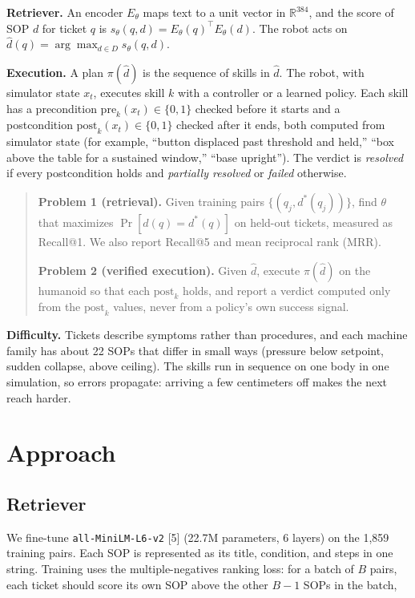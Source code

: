 \documentclass[
  10pt,
  twocolumn]{article}
\begin{document}
\textbf{Retriever.} An encoder \(E_\theta\) maps text to a unit vector
in \(\mathbb{R}^{384}\), and the score of SOP \(d\) for ticket \(q\) is
\(s_\theta(q, d) = E_\theta(q)^\top E_\theta(d)\). The robot acts on
\(\hat d(q) = \arg\max_{d \in D} s_\theta(q, d)\).

\textbf{Execution.} A plan \(\pi(\hat d)\) is the sequence of skills in
\(\hat d\). The robot, with simulator state \(x_t\), executes skill
\(k\) with a controller or a learned policy. Each skill has a
precondition \(\mathrm{pre}_k(x_t) \in \{0, 1\}\) checked before it
starts and a postcondition \(\mathrm{post}_k(x_t) \in \{0, 1\}\) checked
after it ends, both computed from simulator state (for example, ``button
displaced past threshold and held,'' ``box above the table for a
sustained window,'' ``base upright''). The verdict is \emph{resolved} if
every postcondition holds and \emph{partially resolved} or \emph{failed}
otherwise.

\begin{quote}
\textbf{Problem 1 (retrieval).} Given training pairs
\(\{(q_j, d^*(q_j))\}\), find \(\theta\) that maximizes
\(\Pr[\hat d(q) = d^*(q)]\) on held-out tickets, measured as Recall@1.
We also report Recall@5 and mean reciprocal rank (MRR).

\textbf{Problem 2 (verified execution).} Given \(\hat d\), execute
\(\pi(\hat d)\) on the humanoid so that each \(\mathrm{post}_k\) holds,
and report a verdict computed only from the \(\mathrm{post}_k\) values,
never from a policy's own success signal.
\end{quote}

\textbf{Difficulty.} Tickets describe symptoms rather than procedures,
and each machine family has about 22 SOPs that differ in small ways
(pressure below setpoint, sudden collapse, above ceiling). The skills
run in sequence on one body in one simulation, so errors propagate:
arriving a few centimeters off makes the next reach harder.

\section{Approach}\label{approach}

\subsection{Retriever}\label{retriever}

We fine-tune \texttt{all-MiniLM-L6-v2} {[}5{]} (22.7M parameters, 6
layers) on the 1,859 training pairs. Each SOP is represented as its
title, condition, and steps in one string. Training uses the
multiple-negatives ranking loss: for a batch of \(B\) pairs, each ticket
should score its own SOP above the other \(B - 1\) SOPs in the batch,
\end{document}
